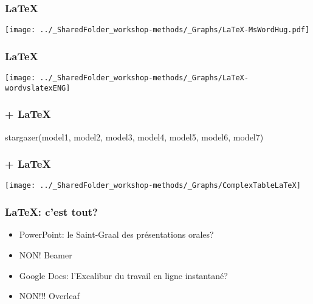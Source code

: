 \documentclass{beamer}
\begin{document}
    \begin{frame}
        \frametitle{\LaTeX} \vspace{1cm}   
        \begin{center}
           \texttt{[image: ../\_SharedFolder\_workshop-methods/\_Graphs/LaTeX-MsWordHug.pdf]}
        \end{center}  
    \end{frame}

    \begin{frame}
        \frametitle{\LaTeX} \vspace{1cm}
        \begin{center}
           \texttt{[image: ../\_SharedFolder\_workshop-methods/\_Graphs/LaTeX-wordvslatexENG]}
        \end{center} 
    \end{frame}
 
    \begin{frame}[fragile=singleslide]
        \frametitle{\R + \LaTeX} \vspace{0.5cm} 
        \begin{code}
stargazer(model1, model2, model3, model4, model5, model6, model7)
        \end{code}
    \end{frame}   

    \begin{frame}
        \frametitle{\R + \LaTeX} \vspace{1cm}   
        \begin{center}
           \texttt{[image: ../\_SharedFolder\_workshop-methods/\_Graphs/ComplexTableLaTeX]}
        \end{center}  
    \end{frame}

  \begin{frame}
        \frametitle{\LaTeX: c'est tout?} \vspace{1cm}  
        \begin{itemize}
            \item<2-> PowerPoint: le Saint-Graal des présentations orales?
            \item<3-> NON! Beamer
            \item<4-> Google Docs: l'Excalibur du travail en ligne instantané?
            \item<5-> NON!!! Overleaf
        \end{itemize}
    \end{frame}
\end{document}
